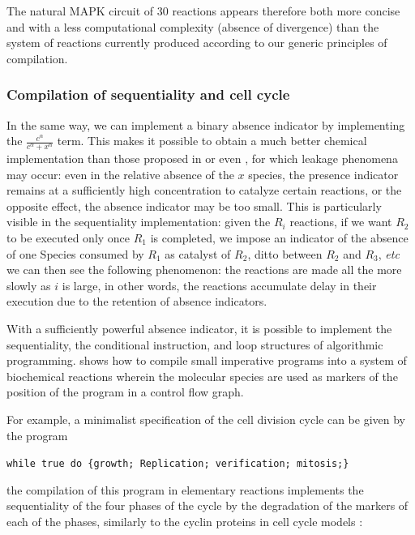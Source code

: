\documentclass[graybox]{svmult}
\begin{document}
The natural MAPK circuit of 30 reactions appears therefore both more concise and with a less computational complexity (absence of divergence)
than the system of reactions currently produced according to our generic principles of compilation.


\subsubsection{Compilation of sequentiality and cell cycle}

In the same way, we can implement a binary absence indicator by implementing the $ \frac{c ^{\alpha}}{c ^{\alpha} + x ^{\alpha}} $ term.
This makes it possible to obtain a much better chemical implementation than those proposed in \cite{SR11plos} or even \cite{HJHC12iccad},
for which leakage phenomena may occur:
even in the relative absence of the $ x $ species, the presence indicator remains at a sufficiently high concentration to catalyze certain reactions,
or the opposite effect,
the absence indicator may be too small.
This is particularly visible in the sequentiality implementation: given the $ R_i $ reactions, if we want $ R_2 $ to be executed only once $ R_1 $ is completed, we impose an indicator of the absence of one Species consumed by $ R_1 $ as catalyst of $ R_2 $, ditto between $ R_2 $ and $ R_3 $, \textit{etc}
we can then see the following phenomenon: the reactions are made all the more slowly as $ i $ is large, in other words, the reactions accumulate delay in their execution due to the retention of absence indicators.

With a sufficiently powerful absence indicator, it is possible to implement the sequentiality, the conditional instruction,
and loop structures of algorithmic programming.
\cite{HJHC12iccad} shows how to compile small imperative programs into a system of biochemical reactions
wherein the molecular species are used as markers of the position of the program in a control flow graph.

For example, a minimalist specification of the cell division cycle
can be given by the program \\
\centerline{\small \texttt{while true do \{growth; Replication; verification; mitosis;\}}}
the compilation of this program in elementary reactions implements the sequentiality of the four phases of the cycle by the degradation
of the markers of each of the phases, similarly to the cyclin proteins
in cell cycle models \cite{GG09pnas}: \\
\end{document}
